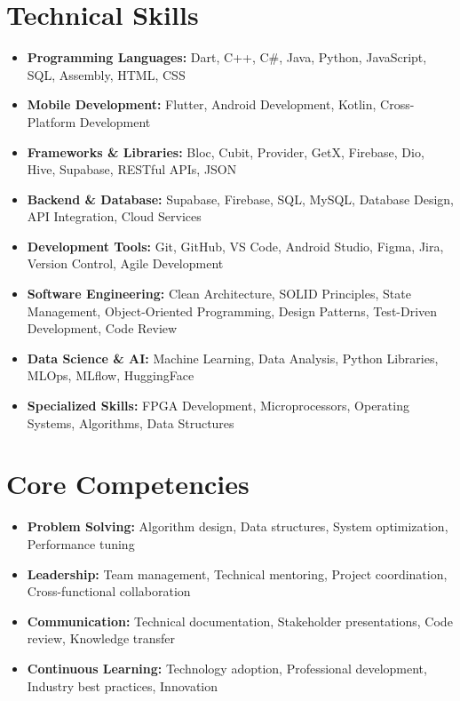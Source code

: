\documentclass[10pt, letterpaper]{article}
\newenvironment{highlights}{
\begin{itemize}[
topsep=0.10 cm,
parsep=0.10 cm,
partopsep=0pt,
itemsep=0pt,
leftmargin=0 cm + 10pt
]
}{
\end{itemize}
} %
\begin{document}
\vspace{0.2 cm}


\section{Technical Skills}
\vspace{0.1cm}

\begin{highlights}
\item \textbf{Programming Languages:} Dart, C++, C\#, Java, Python, JavaScript, SQL, Assembly, HTML, CSS
\item \textbf{Mobile Development:} Flutter, Android Development, Kotlin, Cross-Platform Development
\item \textbf{Frameworks \& Libraries:} Bloc, Cubit, Provider, GetX, Firebase, Dio, Hive, Supabase, RESTful APIs, JSON
\item \textbf{Backend \& Database:} Supabase, Firebase, SQL, MySQL, Database Design, API Integration, Cloud Services
\item \textbf{Development Tools:} Git, GitHub, VS Code, Android Studio, Figma, Jira, Version Control, Agile Development
\item \textbf{Software Engineering:} Clean Architecture, SOLID Principles, State Management, Object-Oriented Programming, Design Patterns, Test-Driven Development, Code Review
\item \textbf{Data Science \& AI:} Machine Learning, Data Analysis, Python Libraries, MLOps, MLflow, HuggingFace
\item \textbf{Specialized Skills:} FPGA Development, Microprocessors, Operating Systems, Algorithms, Data Structures
\end{highlights}

\section{Core Competencies}
\vspace{0.1cm}

\begin{highlights}
\item \textbf{Problem Solving:} Algorithm design, Data structures, System optimization, Performance tuning
\item \textbf{Leadership:} Team management, Technical mentoring, Project coordination, Cross-functional collaboration
\item \textbf{Communication:} Technical documentation, Stakeholder presentations, Code review, Knowledge transfer
\item \textbf{Continuous Learning:} Technology adoption, Professional development, Industry best practices, Innovation
\end{highlights}
\end{document}
